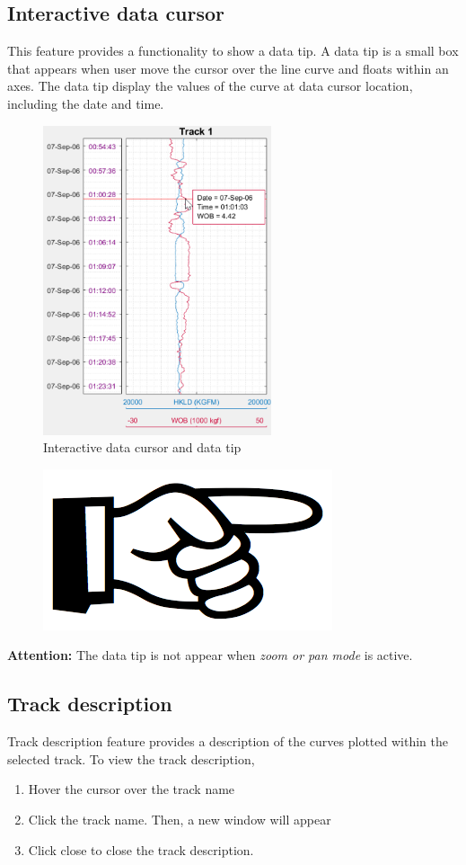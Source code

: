 \documentclass[12pt,a4paper,oneside]{report}
\begin{document}
\subsection{Interactive data cursor}
This feature provides a functionality to show a data tip. A data tip is a small box that appears when user move the cursor over the line curve and floats within an axes. The data tip display the values of the curve at data cursor location, including the date and time.
\begin{figure}[H]
\centering
\includegraphics[width=0.6\textwidth]{cursor.png}
\caption{Interactive data cursor and data tip}
\end{figure}

\begin{figure}
\vspace{-15pt}
\includegraphics[scale=0.08]{hand_point.png}
\end{figure}
\noindent\textbf{Attention:} The data tip is not appear when \emph{zoom or pan mode} is active.

\subsection{Track description}
Track description feature provides a description of the curves plotted within the selected track. To view the track description,
\begin{enumerate}
\setlength\itemsep{0.1em}
\item Hover the cursor over the track name
\item Click the track name. Then, a new window will appear
\item Click close to close the track description.
\end{enumerate}
\end{document}
